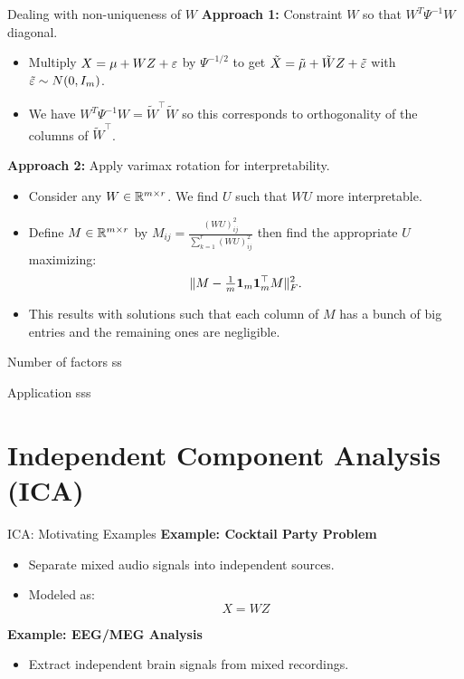 \documentclass[11pt,handout,aspectratio=169]{beamer}
\begin{document}
\begin{frame}{Dealing with non-uniqueness of $W$}
\textbf{Approach 1: } Constraint $W$ so that $W^T\Psi^{-1}W$ diagonal.
    \begin{itemize}
        \item Multiply $X=\mu+WZ+\varepsilon$ by $\Psi^{-1/2}$ to get $\tilde X=\tilde \mu+\tilde WZ+\tilde {\varepsilon}$ with $\tilde{\varepsilon}\sim N(0,I_m)$.
        \item We have $W^T\Psi^{-1}W=\tilde W^\top \tilde W$ so this corresponds to orthogonality of the columns of $\tilde W^\top$.
    \end{itemize}
    \bigskip
    
    \textbf{Approach 2: } Apply varimax rotation for interpretability.
    \begin{itemize}
    	\item Consider any $W\in \mathbb R^{m\times r}$. We find $U$ such that $WU$ more interpretable. 
    	\item Define $M\in \mathbb R^{m\times r}$ by $M_{ij}=\frac{(WU)_{ij}^2}{\sum_{k=1}^r (WU)_{ij}^2}$ then find the appropriate $U$ maximizing: 
    	$$\|M-\tfrac1m \boldsymbol 1_m\boldsymbol 1_m^\top M\|^2_F.$$
    	\item This results with solutions such that each column of $M$ has a bunch of big entries and the remaining ones are negligible.
    \end{itemize}
\end{frame}

\begin{frame}{Number of factors}
	ss
\end{frame}

\begin{frame}{Application}
	sss
\end{frame}

\section{Independent Component Analysis (ICA)}

\begin{frame}{ICA: Motivating Examples}
    \textbf{Example: Cocktail Party Problem}
    \begin{itemize}
        \item Separate mixed audio signals into independent sources.
        \item Modeled as: \[ X = WZ \]
    \end{itemize}
    \textbf{Example: EEG/MEG Analysis}
    \begin{itemize}
        \item Extract independent brain signals from mixed recordings.
    \end{itemize}
\end{frame}
\end{document}
